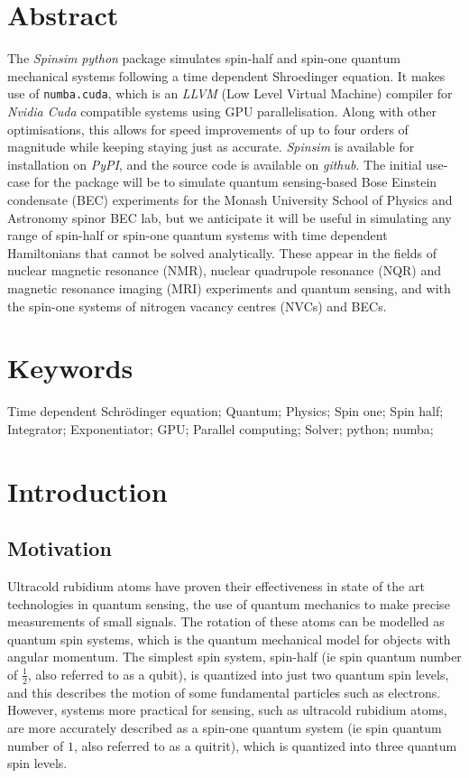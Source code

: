 \documentclass{jors}
\begin{document}
\section{Abstract}
	The \emph{Spinsim} \emph{python} package simulates spin-half and spin-one quantum mechanical systems following a time dependent Shroedinger equation.
	It makes use of \texttt{numba.cuda}, which is an \emph{LLVM} (Low Level Virtual Machine) compiler for \emph{Nvidia Cuda} compatible systems using GPU parallelisation. 
	Along with other optimisations, this allows for speed improvements of up to four orders of magnitude while keeping staying just as accurate.
	\emph{Spinsim} is available for installation on \emph{PyPI}, and the source code is available on \emph{github}.
	The initial use-case for the package will be to simulate quantum sensing-based Bose Einstein condensate (BEC) experiments for the Monash University School of Physics and Astronomy spinor BEC lab, but we anticipate it will be useful in simulating any range of spin-half or spin-one quantum systems with time dependent Hamiltonians that cannot be solved analytically.
	These appear in the fields of nuclear magnetic resonance (NMR), nuclear quadrupole resonance (NQR) and magnetic resonance imaging (MRI) experiments and quantum sensing, and with the spin-one systems of nitrogen vacancy centres (NVCs) and BECs.

\section{Keywords}
Time dependent Schr\"odinger equation; Quantum; Physics; Spin one; Spin half; Integrator; Exponentiator; GPU; Parallel computing; Solver; python; numba;

\section{Introduction}
\subsection{Motivation}
	Ultracold rubidium atoms have proven their effectiveness in state of the art technologies in quantum sensing\cite{degen_quantum_2017}, the use of quantum mechanics to make precise measurements of small signals.
	The rotation of these atoms can be modelled as quantum spin systems, which is the quantum mechanical model for objects with angular momentum.
	The simplest spin system, spin-half (ie spin quantum number of $ \frac12 $, also referred to as a qubit), is quantized into just two quantum spin levels, and this describes the motion of some fundamental particles such as electrons.
	However, systems more practical for sensing, such as ultracold rubidium atoms, are more accurately described as a spin-one quantum system (ie spin quantum number of $ 1 $, also referred to as a quitrit), which is quantized into three quantum spin levels.
	
\end{document}
